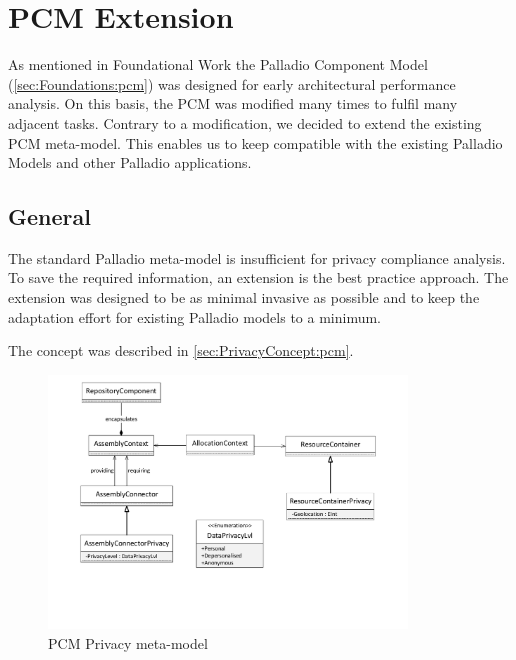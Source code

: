 
\chapter{PCM Extension}
\label{ch:pcmExtension}

As mentioned in Foundational Work the Palladio Component Model (\autoref{sec:Foundations:pcm}) was designed for early architectural performance analysis. On this basis, the PCM was modified many times to fulfil many adjacent tasks. Contrary to a modification, we decided to extend the existing PCM meta-model. This enables us to keep compatible with the existing Palladio Models and other Palladio applications.

\section{General}
\label{sec:pcmExtension:general}

The standard Palladio meta-model is insufficient for privacy compliance analysis. To save the required information, an extension is the best practice approach. The extension was designed to be as minimal invasive as possible and to keep the adaptation effort for existing Palladio models to a minimum.

The concept was described in \autoref{sec:PrivacyConcept:pcm}.

\begin{figure}[h]
	\centering
	\includegraphics[trim = 20mm 50mm 20mm 05mm, clip, width=0.85\textwidth]{graphs/pcm_privacy_meta}
	\caption{PCM Privacy meta-model}
	\label{fig:pcmExtension:meta}
\end{figure}


